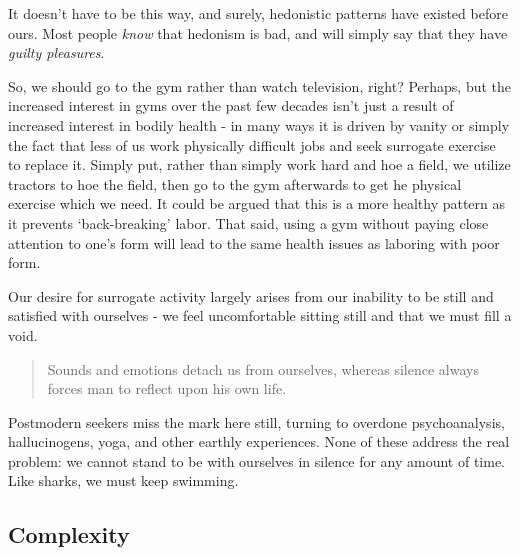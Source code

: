 \documentclass[letterpaper]{article}
\begin{document}
It doesn't have to be this way, and surely, hedonistic patterns have existed before ours. Most people \textit{know} that hedonism is bad, and will simply say that they have \textit{guilty pleasures}. 

So, we should go to the gym rather than watch television, right? Perhaps, but the increased interest in gyms over the past few decades isn't just a result of increased interest in bodily health - in many ways it is driven by vanity or simply the fact that less of us work physically difficult jobs and seek surrogate exercise to replace it. Simply put, rather than simply work hard and hoe a field, we utilize tractors to hoe the field, then go to the gym afterwards to get he physical exercise which we need. It could be argued that this is a more healthy pattern as it prevents `back-breaking' labor. That said, using a gym without paying close attention to one's form will lead to the same health issues as laboring with poor form.

Our desire for surrogate activity largely arises from our inability to be still and satisfied with ourselves - we feel uncomfortable sitting still and that we must fill a void.

\begin{quote}
  Sounds and emotions detach us from ourselves, whereas silence always forces man to reflect upon his own life.
\end{quote}

Postmodern seekers miss the mark here still, turning to overdone psychoanalysis, hallucinogens, yoga, and other earthly experiences. None of these address the real problem: we cannot stand to be with ourselves in silence for any amount of time. Like sharks, we must keep swimming.


\iffalse
\begin{quote}
  One should remember that it is in accordance with the taste of one's heart that the future eternal mansion will be given, and that the taste in one's heart there will be the very one that is formed here. It is evident that theaters, shows, and similar things are not suitable for Christians.
  \attrib{\textit{The Path to Salvation} 60, St. Theophan the Recluse 1996}
\end{quote}
\fi

\iffalse
\subsection{Complexity}
\end{document}
